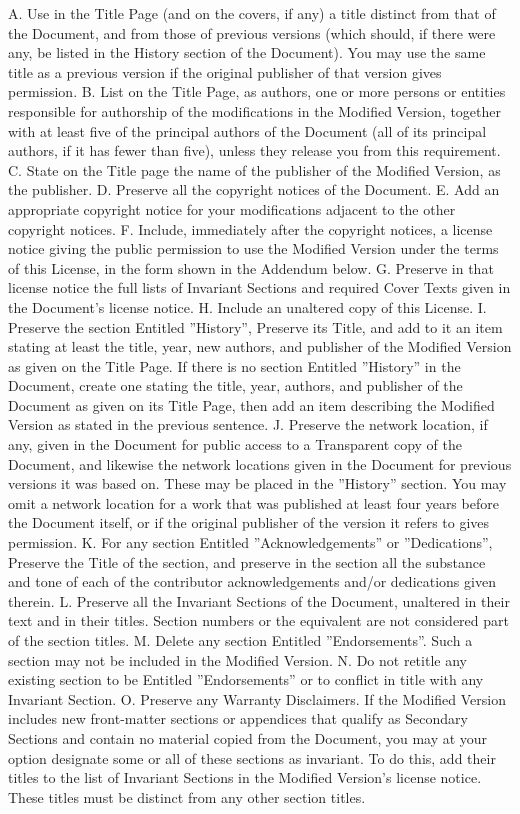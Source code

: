 A. Use in the Title Page (and on the covers, if any) a title distinct from that of the Document, and from those of
previous versions (which should, if there were any, be listed in the History section of the Document). You may use the
same title as a previous version if the original publisher of that version gives permission. B. List on the Title Page,
as authors, one or more persons or entities responsible for authorship of the modifications in the Modified Version,
together with at least five of the principal authors of the Document (all of its principal authors, if it has fewer
than five), unless they release you from this requirement. C. State on the Title page the name of the publisher of the
Modified Version, as the publisher. D. Preserve all the copyright notices of the Document. E. Add an appropriate
copyright notice for your modifications adjacent to the other copyright notices. F. Include, immediately after the
copyright notices, a license notice giving the public permission to use the Modified Version under the terms of this
License, in the form shown in the Addendum below. G. Preserve in that license notice the full lists of Invariant
Sections and required Cover Texts given in the Document's license notice. H. Include an unaltered copy of this License.
I. Preserve the section Entitled ''History'', Preserve its Title, and add to it an item stating at least the title,
year, new authors, and publisher of the Modified Version as given on the Title Page. If there is no section Entitled
''History'' in the Document, create one stating the title, year, authors, and publisher of the Document as given on its
Title Page, then add an item describing the Modified Version as stated in the previous sentence. J. Preserve the
network location, if any, given in the Document for public access to a Transparent copy of the Document, and likewise
the network locations given in the Document for previous versions it was based on. These may be placed in the
''History'' section. You may omit a network location for a work that was published at least four years before the
Document itself, or if the original publisher of the version it refers to gives permission. K. For any section Entitled
''Acknowledgements'' or ''Dedications'', Preserve the Title of the section, and preserve in the section all the
substance and tone of each of the contributor acknowledgements and/or dedications given therein. L. Preserve all the
Invariant Sections of the Document, unaltered in their text and in their titles. Section numbers or the equivalent are
not considered part of the section titles. M. Delete any section Entitled ''Endorsements''. Such a section may not be
included in the Modified Version. N. Do not retitle any existing section to be Entitled ''Endorsements'' or to conflict
in title with any Invariant Section. O. Preserve any Warranty Disclaimers. If the Modified Version includes new
front-matter sections or appendices that qualify as Secondary Sections and contain no material copied from the
Document, you may at your option designate some or all of these sections as invariant. To do this, add their titles to
the list of Invariant Sections in the Modified Version's license notice. These titles must be distinct from any other
section titles.

